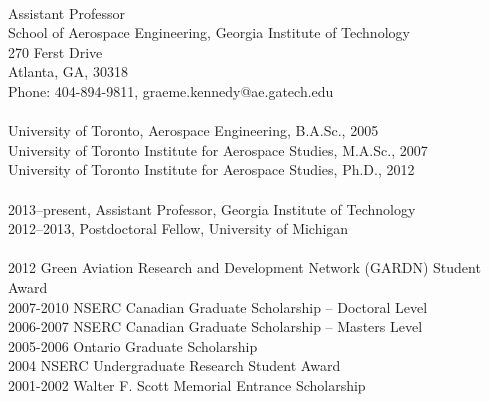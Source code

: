 \documentclass[12pt,headinclude,headsepline]{article}
\begin{document}
 \\
Assistant Professor \\
School of Aerospace Engineering, Georgia Institute of Technology \\
270 Ferst Drive \\
Atlanta, GA, 30318 \\
Phone: 404-894-9811, graeme.kennedy@ae.gatech.edu \\

 \\
University of Toronto, Aerospace Engineering, B.A.Sc., 2005 \\
University of Toronto Institute for Aerospace Studies, M.A.Sc., 2007 \\
University of Toronto Institute for Aerospace Studies, Ph.D., 2012 \\

 \\
2013--present, Assistant Professor, Georgia Institute of Technology \\
2012--2013, Postdoctoral Fellow, University of Michigan \\

 \\
2012 Green Aviation Research and Development Network (GARDN) Student Award \\
2007-2010 NSERC Canadian Graduate Scholarship – Doctoral Level \\
2006-2007 NSERC Canadian Graduate Scholarship – Masters Level \\
2005-2006 Ontario Graduate Scholarship \\
2004 NSERC Undergraduate Research Student Award \\ 
2001-2002 Walter F. Scott Memorial Entrance Scholarship \\


\renewcommand{\section}[2]{}
\end{document}
